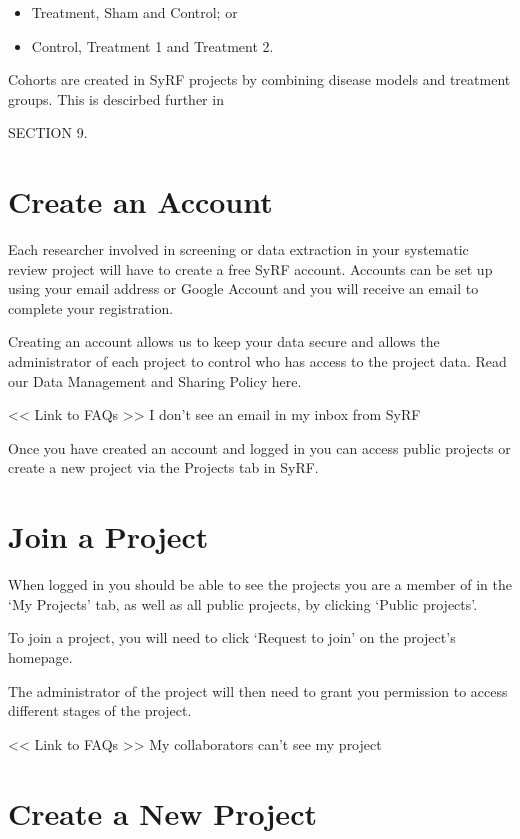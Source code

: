 \documentclass[
]{book}
\providecommand{\tightlist}{%
  \setlength{\itemsep}{0pt}\setlength{\parskip}{0pt}}
\begin{document}
\begin{itemize}
\tightlist
\item
  Treatment, Sham and Control; or
\item
  Control, Treatment 1 and Treatment 2.
\end{itemize}

Cohorts are created in SyRF projects by combining disease models and treatment groups. This is descirbed further in

SECTION 9.

\hypertarget{createAccount}{%
\chapter{Create an Account}\label{createAccount}}

Each researcher involved in screening or data extraction in your systematic review project will have to create a free SyRF account. Accounts can be set up using your email address or Google Account and you will receive an email to complete your registration.

Creating an account allows us to keep your data secure and allows the administrator of each project to control who has access to the project data. Read our Data Management and Sharing Policy here.

\textless{}\textless{} Link to FAQs \textgreater{}\textgreater{}
I don't see an email in my inbox from SyRF

Once you have created an account and logged in you can access public projects or create a new project via the Projects tab in SyRF.

\hypertarget{join}{%
\chapter{Join a Project}\label{join}}

When logged in you should be able to see the projects you are a member of in the `My Projects' tab, as well as all public projects, by clicking `Public projects'.

To join a project, you will need to click `Request to join' on the project's homepage.

The administrator of the project will then need to grant you permission to access different stages of the project.

\textless{}\textless{} Link to FAQs \textgreater{}\textgreater{}
My collaborators can't see my project

\hypertarget{createProject}{%
\chapter{Create a New Project}\label{createProject}}
\end{document}
